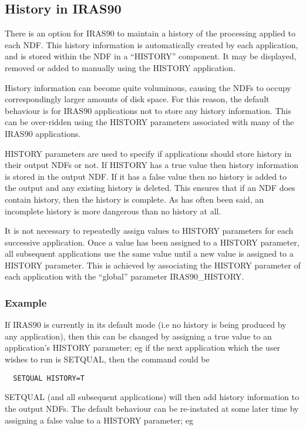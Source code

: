 \subsection{History in IRAS90}
\label{SEC:HIS}
There is an option for {\small IRAS90} to maintain a history of the
processing applied to each {\small NDF}. This history information is
automatically created by each application, and is
stored within the {\small NDF} in a ``{\small HISTORY}'' component. It may be
displayed, removed or added to manually using the {\small HISTORY}
application.

History information can become quite voluminous, causing the {\small NDF}s
to occupy correspondingly larger amounts of disk space. For this
reason, the default behaviour is for {\small IRAS90} applications not to
store any history information. This can be over-ridden using the
{\small HISTORY} parameters associated with many of the {\small IRAS90}
applications.

{\small HISTORY} parameters are used to specify if applications should
store history in their output {\small NDF}s or not. If {\small HISTORY} has a true
value then history information is stored in the output {\small NDF}. If
it has a false value then no history is added to the output and
any existing history is deleted. This ensures that if an {\small NDF}
does contain history, then the history is complete. As has often
been said, an incomplete history is more dangerous than no
history at all.

It is not necessary to repeatedly assign values to {\small HISTORY}
parameters for each successive application. Once a value has
been assigned to a {\small HISTORY} parameter, all subsequent
applications use the same value until a new value is assigned
to a {\small HISTORY} parameter. This is achieved by associating the
{\small HISTORY} parameter of each application with the ``global''
parameter {\small IRAS90\_HISTORY}.

\subsubsection{Example}
If {\small IRAS90} is currently in its default mode (i.e no history is
being produced by any application), then this can be changed by
assigning a true value to an application's {\small HISTORY} parameter; eg
if the next application which the user wishes to run is {\small SETQUAL},
then the command could be

\small
\begin{verbatim}
  SETQUAL HISTORY=T
\end{verbatim}
\normalsize
{\small SETQUAL} (and all subsequent applications) will then add history
information to the output {\small NDF}s. The default behaviour can be
re-instated at some later time by assigning a false value to a
{\small HISTORY} parameter; eg


